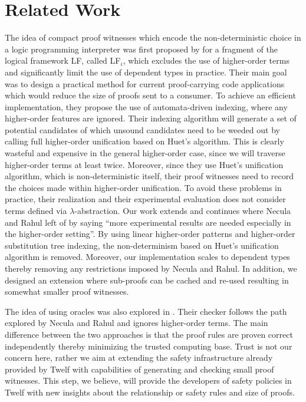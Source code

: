 \documentclass{llncs}
\newcommand{\ednote}[1]{\footnote{\it #1}}
\begin{document}
\section{Related Work}
The idea of compact proof witnesses which encode the non-deterministic
choice in a logic programming interpreter was first proposed by
\cite{Necula+01:oracle} for a fragment of the logical framework LF,
called LF$_i$, which excludes the use of higher-order terms and
significantly limit the use of dependent types in practice.  Their
main goal was to design a practical method for current proof-carrying
code applications which would reduce the size of proofs sent to a
consumer.
To achieve an efficient implementation, they propose the use of
automata-driven indexing, where any higher-order features are
ignored. Their indexing algorithm will generate a set of potential
candidates of which unsound candidates need to be weeded out by
calling full higher-order unification based on Huet's algorithm. This
is clearly wasteful and expensive in the general higher-order case,
since we will traverse higher-order terms at least twice. Moreover,
since they use Huet's unification algorithm, which is
non-deterministic itself, their proof witnesses need to record the
choices made within higher-order unification. To avoid these problems
in practice, their realization and their experimental evaluation does
not consider terms defined via $\lambda$-abstraction.  
Our work extends and continues where Necula and Rahul left of by
saying ``more experimental results are needed especially in the
higher-order setting''. By using linear higher-order patterns and
higher-order substitution tree indexing, the non-determinism based on
Huet's unification algorithm is removed. Moreover, our implementation
scales to dependent types thereby removing any restrictions imposed by
Necula and Rahul. In addition, we designed an extension where
sub-proofs can be cached and re-used resulting in somewhat smaller
proof witnesses.

The idea of using oracles was also explored in \cite{Appel:PPDP03}.
Their checker follows the path explored by Necula and Rahul and
ignores higher-order terms. The main difference between the two
approaches is that the proof rules are proven correct independently
thereby minimizing the trusted computing base. Trust is not our
concern here, rather we aim at extending the safety infrastructure
already provided by Twelf with capabilities of generating and checking
small proof witnesses. This step, we believe, will provide the
developers of safety policies in Twelf with new insights about the
relationship or safety rules and size of proofs.
\end{document}
